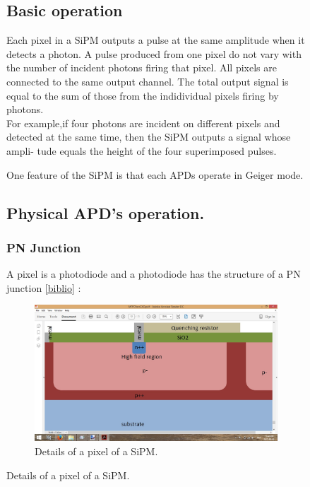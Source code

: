 \documentclass[a4paper, 11pt]{report}%
\begin{document}
\begin{figure}[!hbtp]
  \subsection{Basic operation}\label{basic operation}
  
  Each pixel in a SiPM outputs a pulse at the same amplitude when it detects a photon. 
  A pulse produced from one pixel do not vary with the number of incident photons firing that pixel. 
  All pixels are connected to the same output channel. The total output signal is equal to the sum of those from the indidividual pixels 
  firing by photons.
  \\
  
  For example,if four photons are incident on different pixels and detected at the same time, then the SiPM outputs a signal whose ampli-
  tude equals the height of the four superimposed pulses.

 
  One feature of the SiPM is that each APDs operate in Geiger mode.
  
  \subsection{Physical APD's operation.}
  
  \subsubsection{PN Junction}
  A pixel is a photodiode and a photodiode has the structure of a PN junction \ref{biblio} :
  
  \begin{figure}[!hbtp]
  \centering
  \includegraphics[trim=1.5cm 2cm 5.5cm 3cm, clip=true,totalheight=.4\textwidth]{Pictures/blabla/PN_junction.jpg}%
  \caption{Details of a pixel of a SiPM.}
  \label{fig:PN_junction}
  \end{figure}
  

\end{figure}
\end{document}
